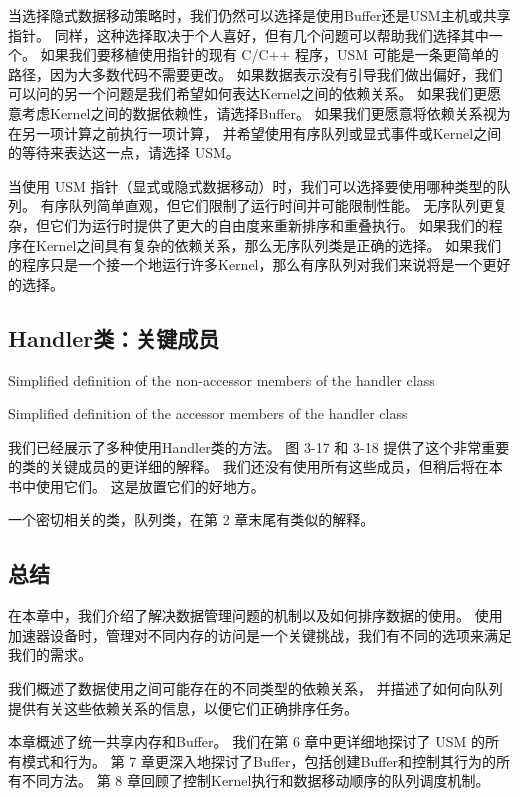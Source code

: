 当选择隐式数据移动策略时，我们仍然可以选择是使用Buffer还是USM主机或共享指针。 
同样，这种选择取决于个人喜好，但有几个问题可以帮助我们选择其中一个。 
如果我们要移植使用指针的现有 C/C++ 程序，USM 可能是一条更简单的路径，因为大多数代码不需要更改。 
如果数据表示没有引导我们做出偏好，我们可以问的另一个问题是我们希望如何表达Kernel之间的依赖关系。 
如果我们更愿意考虑Kernel之间的数据依赖性，请选择Buffer。 
如果我们更愿意将依赖关系视为在另一项计算之前执行一项计算，
并希望使用有序队列或显式事件或Kernel之间的等待来表达这一点，请选择 USM。

当使用 USM 指针（显式或隐式数据移动）时，我们可以选择要使用哪种类型的队列。 
有序队列简单直观，但它们限制了运行时间并可能限制性能。 
无序队列更复杂，但它们为运行时提供了更大的自由度来重新排序和重叠执行。 
如果我们的程序在Kernel之间具有复杂的依赖关系，那么无序队列类是正确的选择。 
如果我们的程序只是一个接一个地运行许多Kernel，那么有序队列对我们来说将是一个更好的选择。

\subsection{Handler类：关键成员}
{\color{red} Simplified definition of the non-accessor members of the handler class}

{\color{red} Simplified definition of the accessor members of the handler class}

我们已经展示了多种使用Handler类的方法。 图 3-17 和 3-18 提供了这个非常重要的类的关键成员的更详细的解释。 
我们还没有使用所有这些成员，但稍后将在本书中使用它们。 这是放置它们的好地方。

一个密切相关的类，队列类，在第 2 章末尾有类似的解释。

\subsection{总结}
在本章中，我们介绍了解决数据管理问题的机制以及如何排序数据的使用。 
使用加速器设备时，管理对不同内存的访问是一个关键挑战，我们有不同的选项来满足我们的需求。

我们概述了数据使用之间可能存在的不同类型的依赖关系，
并描述了如何向队列提供有关这些依赖关系的信息，以便它们正确排序任务。

本章概述了统一共享内存和Buffer。 我们在第 6 章中更详细地探讨了 USM 的所有模式和行为。
第 7 章更深入地探讨了Buffer，包括创建Buffer和控制其行为的所有不同方法。 
第 8 章回顾了控制Kernel执行和数据移动顺序的队列调度机制。